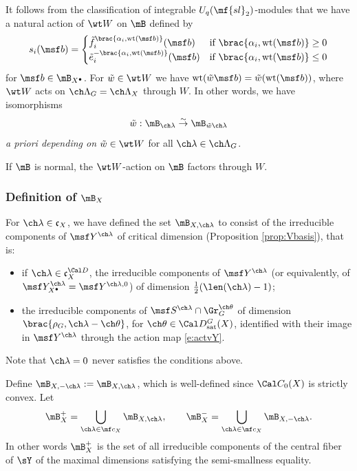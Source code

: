 \documentclass[final]{amsart}
\theoremstyle{remark}
\theoremstyle{definition}
\numberwithin{equation}{section}
\begin{document}
It follows from the classification of integrable $U_q(\mf{sl}_2)$-modules that
we have a natural action of $\wt W$ on $\mB$ defined by 
\[
s_i(\msf b) = \begin{cases} 
    \tilde f_i^{\brac{\alpha_i, \mathrm{wt}(\msf b)}}(\msf b) &\text{if } 
    \brac{\alpha_i,\mathrm{wt}(\msf b)} \ge 0 \\
    \tilde e_i^{-\brac{\alpha_i, \mathrm{wt}(\msf b)}}(\msf b) &\text{if } 
    \brac{\alpha_i,\mathrm{wt}(\msf b)} \le 0 
\end{cases}
\]
for $\msf b\in \mB_{X^\bullet}$. 
For $\tilde w\in \wt W$ we have $\mathrm{wt}(\tilde w \msf b) = \tilde w (\mathrm{wt}(\msf b))$, 
where $\wt W$ acts on $\ch\Lambda_G=\ch\Lambda_X$ through $W$. 
In other words, we have isomorphisms 
\begin{equation} \label{e:crysW}
 \tilde w: \mB_{\ch\lambda} \overset\sim\to \mB_{\tilde w \ch\lambda} 
\end{equation}
\emph{a priori depending on} $\tilde w \in \wt W$ for all $\ch\lambda\in\ch\Lambda_G$.

If $\mB$ is normal, the $\wt W$-action on $\mB$ factors through $W$. 


\subsubsection{Definition of $\mB_X$}\label{sect:defcrys}

For $\ch\lambda \in \mathfrak c_X$, we have defined the set 
$\mB_{X,\ch\lambda}$ to consist of 
the irreducible components of $\msf Y^{\ch\lambda}$ of critical dimension (Proposition \ref{prop:Vbasis}), that is:
\begin{itemize}
 \item if $\ch\lambda\in\mathfrak c^{\Cal D}_X$, the irreducible components of $\msf Y^{\ch\lambda}$ (or equivalently, of $\msf Y_{X^\bullet}^{\ch\lambda} = \msf Y^{\ch\lambda,0}$) of dimension 
$\frac 1 2 (\len(\ch\lambda)-1)$;
 \item the irreducible components of $\msf S^{\ch\lambda} \cap \Gr_G^{\ch\theta}$
of dimension $\brac{\rho_G,\ch\lambda-\ch\theta}$, for $\ch\theta \in \Cal D^G_{\mathrm{sat}}(X)$, identified with their image in $\msf Y^{\ch\lambda}$ through the action map \eqref{e:actvY}.
\end{itemize}
Note that $\ch\lambda=0$ never satisfies the conditions above.

Define $\mB_{X,-\ch\lambda} := \mB_{X,\ch\lambda}$, which
is well-defined since $\Cal C_0(X)$ is strictly convex. 
Let 
\[ \mB^+_{X} = \bigcup_{\ch\lambda\in \mf c_X} \mB_{X,\ch\lambda}, \qquad 
\mB^-_{X} = \bigcup_{\ch\lambda\in \mf c_X} \mB_{X,-\ch\lambda}. \]
In other words $\mB^+_{X}$ is the set of all irreducible
components of the central fiber of $\sY$ of the maximal dimensions 
satisfying the semi-smallness equality.
\end{document}
